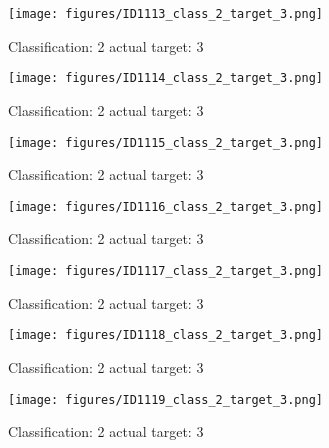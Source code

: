 \begin{figure}[h!]
\begin{center}
\texttt{[image: figures/ID1113\_class\_2\_target\_3.png]}
\end{center}
\caption{ Classification: 2 actual target: 3}
\label{fig:ID1113_class_2_target_3}
\end{figure}
\begin{figure}[h!]
\begin{center}
\texttt{[image: figures/ID1114\_class\_2\_target\_3.png]}
\end{center}
\caption{ Classification: 2 actual target: 3}
\label{fig:ID1114_class_2_target_3}
\end{figure}
\begin{figure}[h!]
\begin{center}
\texttt{[image: figures/ID1115\_class\_2\_target\_3.png]}
\end{center}
\caption{ Classification: 2 actual target: 3}
\label{fig:ID1115_class_2_target_3}
\end{figure}
\begin{figure}[h!]
\begin{center}
\texttt{[image: figures/ID1116\_class\_2\_target\_3.png]}
\end{center}
\caption{ Classification: 2 actual target: 3}
\label{fig:ID1116_class_2_target_3}
\end{figure}
\begin{figure}[h!]
\begin{center}
\texttt{[image: figures/ID1117\_class\_2\_target\_3.png]}
\end{center}
\caption{ Classification: 2 actual target: 3}
\label{fig:ID1117_class_2_target_3}
\end{figure}
\begin{figure}[h!]
\begin{center}
\texttt{[image: figures/ID1118\_class\_2\_target\_3.png]}
\end{center}
\caption{ Classification: 2 actual target: 3}
\label{fig:ID1118_class_2_target_3}
\end{figure}
\begin{figure}[h!]
\begin{center}
\texttt{[image: figures/ID1119\_class\_2\_target\_3.png]}
\end{center}
\caption{ Classification: 2 actual target: 3}
\label{fig:ID1119_class_2_target_3}
\end{figure}
